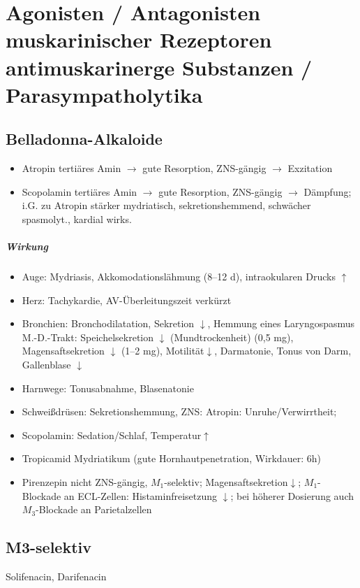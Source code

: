 \documentclass[10pt,a4paper]{report}
\begin{document}
\section{Agonisten / Antagonisten muskarinischer Rezeptoren
antimuskarinerge Substanzen / Parasympatholytika}
\subsection{Belladonna-Alkaloide}
\begin{itemize}
	\item Atropin tertiäres Amin $\rightarrow$ gute Resorption, ZNS-gängig $\rightarrow$ Exzitation
	\item Scopolamin tertiäres Amin $\rightarrow$ gute Resorption, ZNS-gängig
$\rightarrow$ Dämpfung; i.G. zu Atropin stärker mydriatisch, sekretionshemmend, schwächer spasmolyt., kardial wirks.
\end{itemize}
\subparagraph{Wirkung}
\begin{itemize}
	\item Auge:	Mydriasis, Akkomodationslähmung (8–12 d), intraokularen Drucks $\uparrow$
	\item Herz:	Tachykardie, AV-Überleitungszeit verkürzt
	\item Bronchien: 	Bronchodilatation, Sekretion $\downarrow$, Hemmung eines Laryngospasmus
M.-D.-Trakt: Speichelsekretion $\downarrow$ (Mundtrockenheit) (0,5 mg), Magensaftsekretion $\downarrow$ (1–2 mg), Motilität$\downarrow$, Darmatonie, Tonus von Darm, Gallenblase $\downarrow$
	\item Harnwege: 	Tonusabnahme, Blasenatonie 
	\item Schweißdrüsen: Sekretionshemmung, ZNS:    Atropin: Unruhe/Verwirrtheit;  			\item Scopolamin: Sedation/Schlaf, Temperatur$\uparrow$
\end{itemize}
\begin{itemize}
	\item Tropicamid Mydriatikum (gute Hornhautpenetration, Wirkdauer: 6h)
	\item Pirenzepin nicht ZNS-gängig, $M_1$-selektiv; Magensaftsekretion$\downarrow$; $M_1$-Blockade an ECL-Zellen: Histaminfreisetzung $\downarrow$; bei höherer Dosierung auch $M_3$-Blockade an Parietalzellen
\end{itemize}
\subsection{M3-selektiv} Solifenacin, Darifenacin
\end{document}
